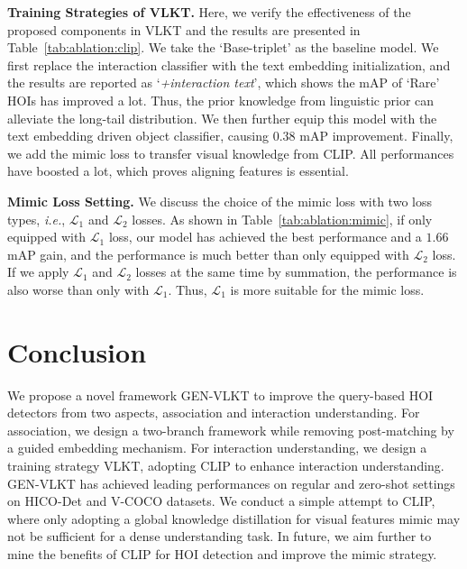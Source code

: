 \documentclass[10pt,twocolumn,letterpaper]{article}
\begin{document}
\vspace{0.5mm}\noindent\textbf{Training Strategies of VLKT.} Here, we verify the effectiveness of the proposed components in VLKT and the results are presented in Table~\ref{tab:ablation:clip}. We take the `Base-triplet' as the baseline model. We first replace the interaction classifier with the text embedding initialization, and the results are reported as `\emph{+interaction text}', which shows the mAP of `Rare' HOIs has improved a lot. Thus, the prior knowledge from linguistic prior can alleviate the long-tail distribution.
We then further equip this model with the text embedding driven object classifier, causing $0.38$ mAP improvement. Finally, we add the mimic loss to transfer visual knowledge from CLIP. All performances have boosted a lot, which proves aligning features is essential. 

\vspace{0.5mm}\noindent\textbf{Mimic Loss Setting.} We discuss the choice of the mimic loss with two loss types, \emph{i.e.}, $\mathcal{L}_1$ and $\mathcal{L}_2$ losses. As shown in Table~\ref{tab:ablation:mimic}, if only equipped with $\mathcal{L}_1$ loss, our model has achieved the best performance and a $1.66$ mAP gain, and the performance is much better than only equipped with $\mathcal{L}_2$ loss. If we apply $\mathcal{L}_1$ and $\mathcal{L}_2$ losses at the same time by summation, the performance is also worse than only with $\mathcal{L}_1$. Thus, $\mathcal{L}_1$ is more suitable for the mimic loss.  

\vspace{-2.5mm}\section{Conclusion}\vspace{-2mm}
We propose a novel framework GEN-VLKT to improve the query-based HOI detectors from two aspects, association and interaction understanding. For association, we design a two-branch framework while removing post-matching by a guided embedding mechanism. For interaction understanding, we design a training strategy VLKT, adopting CLIP to enhance interaction understanding. GEN-VLKT has achieved leading performances on regular and zero-shot settings on HICO-Det and V-COCO datasets. We conduct a simple attempt to CLIP, where only adopting a global knowledge distillation for visual features mimic may not be sufficient for a dense understanding task. In future, we aim further to mine the benefits of CLIP for HOI detection and improve the mimic strategy.







{\small


}
\end{document}
